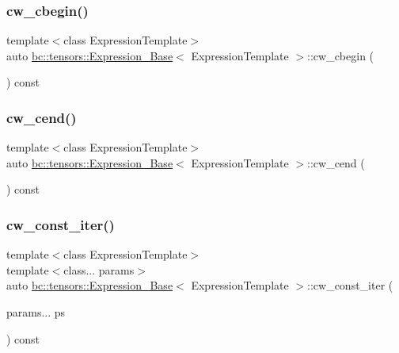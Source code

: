 \subsubsection{\texorpdfstring{cw\+\_\+cbegin()}{cw\_cbegin()}}
{\footnotesize\ttfamily template$<$class Expression\+Template$>$ \\
auto \hyperlink{classbc_1_1tensors_1_1Expression__Base}{bc\+::tensors\+::\+Expression\+\_\+\+Base}$<$ Expression\+Template $>$\+::cw\+\_\+cbegin (\begin{DoxyParamCaption}{ }\end{DoxyParamCaption}) const\hspace{0.3cm}{\ttfamily [inline]}}

\mbox{\label{classbc_1_1tensors_1_1Expression__Base_a7773a1dfda9698eb96513117fd55032d}} 
\subsubsection{\texorpdfstring{cw\+\_\+cend()}{cw\_cend()}}
{\footnotesize\ttfamily template$<$class Expression\+Template$>$ \\
auto \hyperlink{classbc_1_1tensors_1_1Expression__Base}{bc\+::tensors\+::\+Expression\+\_\+\+Base}$<$ Expression\+Template $>$\+::cw\+\_\+cend (\begin{DoxyParamCaption}{ }\end{DoxyParamCaption}) const\hspace{0.3cm}{\ttfamily [inline]}}

\mbox{\label{classbc_1_1tensors_1_1Expression__Base_af99fae801adc324ca99c2473813fc992}} 
\subsubsection{\texorpdfstring{cw\+\_\+const\+\_\+iter()}{cw\_const\_iter()}}
{\footnotesize\ttfamily template$<$class Expression\+Template$>$ \\
template$<$class... params$>$ \\
auto \hyperlink{classbc_1_1tensors_1_1Expression__Base}{bc\+::tensors\+::\+Expression\+\_\+\+Base}$<$ Expression\+Template $>$\+::cw\+\_\+const\+\_\+iter (\begin{DoxyParamCaption}\item[{params...}]{ps }\end{DoxyParamCaption}) const\hspace{0.3cm}{\ttfamily [inline]}}

